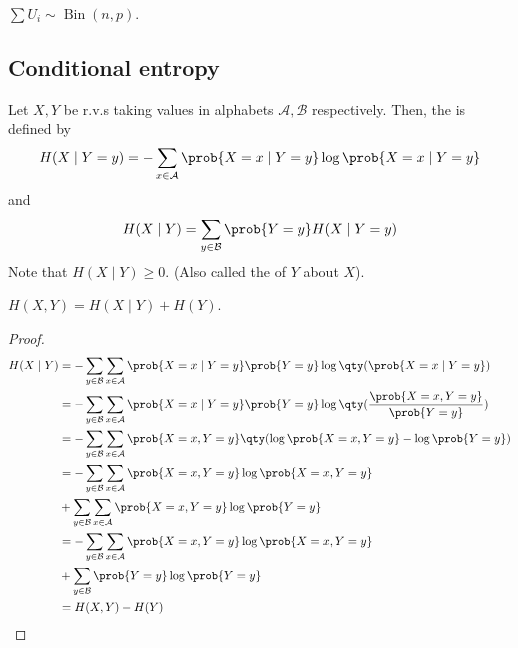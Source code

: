 \begin{remark}
    $\sum U_i \sim \operatorname{Bin}(n, p)$.
\end{remark}

\subsection{Conditional entropy}
\begin{definition}
    Let $X, Y$ be r.v.s taking values in alphabets $\mathcal A, \mathcal B$ respectively.
    Then, the  is defined by
    \begin{align*}
        H(X \mid Y = y) = - \sum_{x \in \mathcal A} \prob{X = x \mid Y = y} \log \prob{X = x \mid Y = y}
    \end{align*}
    and
    \begin{align*}
        H(X \mid Y) = \sum_{y \in \mathcal B} \prob{Y = y} H(X \mid Y = y)
    \end{align*}
    Note that $H(X \mid Y) \geq 0$. (Also called the  of $Y$ about $X$).
\end{definition}

\begin{lemma}
    $H(X,Y) = H(X \mid Y) + H(Y)$.
\end{lemma}

\begin{proof}
    \begin{align*}
        H(X \mid Y) &= -\sum_{y \in \mathcal B} \sum_{x \in \mathcal A} \prob{X = x \mid Y = y} \prob{Y = y} \log \qty(\prob{X = x \mid Y = y}) \\
        &= -\sum_{y \in \mathcal B} \sum_{x \in \mathcal A} \prob{X = x \mid Y = y} \prob{Y = y} \log \qty(\frac{\prob{X = x, Y = y}}{\prob{Y = y}}) \\
        &= -\sum_{y \in \mathcal B} \sum_{x \in \mathcal A} \prob{X = x, Y = y} \qty(\log \prob{X = x, Y = y} - \log \prob{Y = y}) \\
        &= -\sum_{y \in \mathcal B} \sum_{x \in \mathcal A} \prob{X = x, Y = y} \log \prob{X = x, Y = y} \\
        &+ \sum_{y \in \mathcal B} \sum_{x \in \mathcal A} \prob{X = x, Y = y} \log \prob{Y = y} \\
        &= -\sum_{y \in \mathcal B} \sum_{x \in \mathcal A} \prob{X = x, Y = y} \log \prob{X = x, Y = y} \\
        &+ \sum_{y \in \mathcal B} \prob{Y = y} \log \prob{Y = y} \\
        &= H(X,Y) - H(Y)
    \end{align*}
\end{proof}

